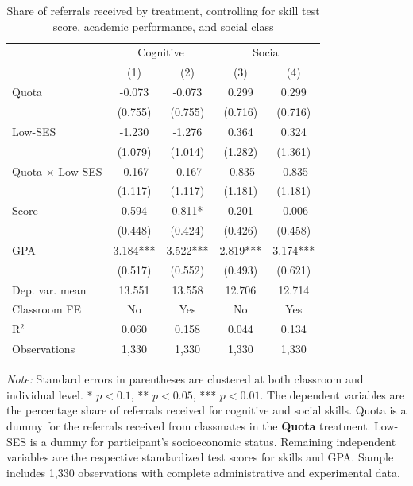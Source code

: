 \documentclass[11pt,a4paper,oneside]{article}
\begin{document}
   \begin{result}
  \end{result}

  \begin{table}[H]
    \centering
    \begin{threeparttable}
    \caption{Share of referrals received by treatment, controlling for skill test score, academic performance, and social class}\label{tab:treatment-effects}
    \begin{tabular*}{\textwidth}{@{\extracolsep{\fill}}l c c c c@{}}
    \toprule
    & \multicolumn{2}{c}{Cognitive} & \multicolumn{2}{c}{Social} \\
    & (1) & (2) & (3) & (4) \\
    \midrule
    Quota & -0.073 & -0.073 & 0.299 & 0.299 \\
    & (0.755) & (0.755) & (0.716) & (0.716) \\
    Low-SES & -1.230 & -1.276 & 0.364 & 0.324 \\
    & (1.079) & (1.014) & (1.282) & (1.361) \\
    Quota × Low-SES & -0.167 & -0.167 & -0.835 & -0.835 \\
    & (1.117) & (1.117) & (1.181) & (1.181) \\
    Score & 0.594 & 0.811* & 0.201 & -0.006 \\
    & (0.448) & (0.424) & (0.426) & (0.458) \\
    GPA & 3.184*** & 3.522*** & 2.819*** & 3.174*** \\
    & (0.517) & (0.552) & (0.493) & (0.621) \\
    \midrule
    Dep. var. mean & 13.551 & 13.558 & 12.706 & 12.714 \\
    Classroom FE & No & Yes & No & Yes \\
    R$^2$ & 0.060 & 0.158 & 0.044 & 0.134 \\
    Observations & 1,330 & 1,330 & 1,330 & 1,330 \\
    \bottomrule
    \end{tabular*}
    \begin{tablenotes}[flushleft]
    \footnotesize
    \item[] \textit{Note:} Standard errors in parentheses are clustered at both classroom and individual level. * $p < 0.1$, ** $p < 0.05$, *** $p < 0.01$. The dependent variables are the percentage share of referrals received for cognitive and social skills. Quota is a dummy for the referrals received from classmates in the \textbf{Quota} treatment. Low-SES is a dummy for participant's socioeconomic status. Remaining independent variables are the respective standardized test scores for skills and GPA. Sample includes 1,330 observations with complete administrative and experimental data.
    \end{tablenotes}
    \end{threeparttable}
  \end{table}
\end{document}
